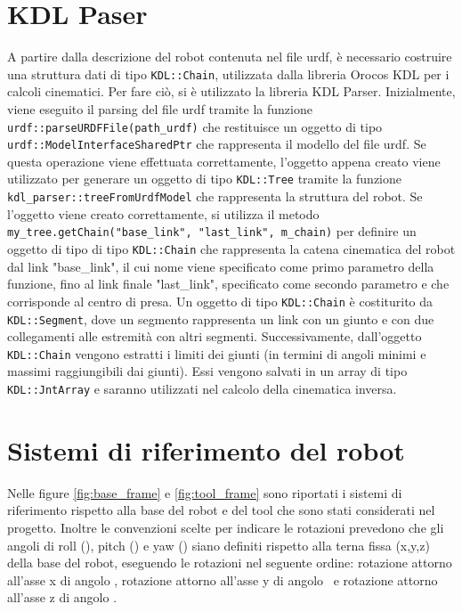 \section{KDL Paser} \label{cap_kdlparser}
A partire dalla descrizione del robot contenuta nel file urdf, è necessario costruire una struttura dati di tipo \texttt{KDL::Chain}, utilizzata dalla libreria Orocos KDL per i calcoli cinematici. Per fare ciò, si è utilizzato la libreria KDL Parser. Inizialmente, viene eseguito il parsing del file urdf tramite la funzione \texttt{urdf::parseURDFFile(path\_urdf)} che restituisce un oggetto di tipo \texttt{urdf::ModelInterfaceSharedPtr} che rappresenta il modello del file urdf. Se questa operazione viene effettuata correttamente, l'oggetto appena creato viene utilizzato per generare un oggetto di tipo \texttt{KDL::Tree} tramite la funzione \texttt{kdl\_parser::treeFromUrdfModel} che rappresenta la struttura del robot. Se l'oggetto viene creato correttamente, si utilizza il metodo \texttt{my\_tree.getChain("base\_link", "last\_link", m\_chain)} per definire un oggetto di tipo di tipo \texttt{KDL::Chain} che rappresenta la catena cinematica del robot dal link "base\_link", il cui nome viene specificato come primo parametro della funzione, fino al link finale "last\_link", specificato come secondo parametro e che corrisponde al centro di presa. Un oggetto di tipo \texttt{KDL::Chain} è costiturito da \texttt{KDL::Segment}, dove un segmento rappresenta un link con un giunto e con due collegamenti alle estremità con altri segmenti. 
Successivamente, dall'oggetto \texttt{KDL::Chain} vengono estratti i limiti dei giunti (in termini di angoli minimi e massimi raggiungibili dai giunti). Essi vengono salvati in un array di tipo \texttt{KDL::JntArray} e saranno utilizzati nel calcolo della cinematica inversa.

\section{Sistemi di riferimento del robot}
Nelle figure \ref{fig:base_frame} e \ref{fig:tool_frame} sono riportati i sistemi di riferimento rispetto alla base del robot e del tool che sono stati considerati nel progetto. Inoltre le convenzioni scelte per indicare le rotazioni prevedono che gli angoli di roll (\textalpha), pitch (\textbeta) e yaw (\textgamma) siano definiti rispetto alla terna fissa (x,y,z) della base del robot, eseguendo le rotazioni nel seguente ordine: rotazione attorno all'asse x di angolo \textalpha, rotazione attorno all'asse y di angolo \textbeta\ e rotazione attorno all'asse z di angolo \textgamma.

